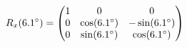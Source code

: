 \documentclass[preview]{standalone}
\begin{document}
\begin{align*}
\special{dvisvgm:raw <g id='unique000'>}R_x(6.1^\circ) = \begin{pmatrix} 1 & 0 & 0 \\ 0 & \cos(6.1^\circ) & -\sin(6.1^\circ) \\ 0 & \sin(6.1^\circ) & \cos(6.1^\circ) \end{pmatrix}\special{dvisvgm:raw </g>}
\end{align*}
\end{document}
